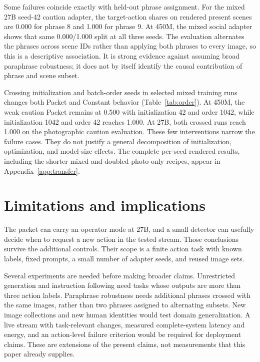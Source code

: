 \documentclass[10pt]{article}
\begin{document}
\begin{table}[htbp]
\begin{tabular}{lllrrrl}
\bottomrule\end{tabular}
\end{table}

Some failures coincide exactly with held-out phrase assignment.
For the mixed 27B seed-42 caution adapter, the target-action shares
on rendered present scenes are 0.000 for phrase 8 and 1.000 for
phrase 9. At 450M, the mixed social adapter shows that same
0.000/1.000 split at all three seeds. The evaluation alternates
the phrases across scene IDs rather than applying both phrases
to every image, so this is a descriptive association. It is
strong evidence against assuming broad paraphrase robustness;
it does not by itself identify the causal contribution of
phrase and scene subset.

Crossing initialization and batch-order seeds in selected mixed
training runs changes both Packet and Constant behavior
(Table~\ref{tab:order}). At 450M, the weak caution Packet remains
at 0.500 with initialization 42 and order 1042, while initialization
1042 and order 42 reaches 1.000. At 27B, both crossed runs reach
1.000 on the photographic caution evaluation. These few
interventions narrow the failure cases. They do not justify a
general decomposition of initialization, optimization, and
model-size effects. The complete per-seed rendered results,
including the shorter mixed and doubled photo-only recipes,
appear in Appendix~\ref{app:transfer}.

\section{Limitations and implications}
The packet can carry an operator mode at 27B, and a small detector
can usefully decide when to request a new action in the tested
stream. Those conclusions survive the additional controls.
Their scope is a finite action task with known labels, fixed
prompts, a small number of adapter seeds, and reused image sets.

Several experiments are needed before making broader claims.
Unrestricted generation and instruction following need tasks
whose outputs are more than three action labels. Paraphrase
robustness needs additional phrases crossed with the same images,
rather than two phrases assigned to alternating subsets.
New image collections and new human identities would test
domain generalization. A live stream with task-relevant changes,
measured complete-system latency and energy, and an action-level
failure criterion would be required for deployment claims.
These are extensions of the present claims, not measurements
that this paper already supplies.
\end{document}
